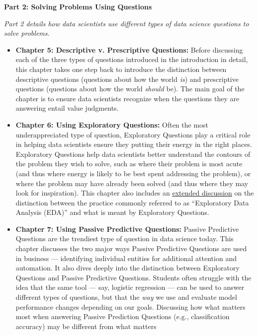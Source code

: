 \documentclass[12pt]{article}
\begin{document}
\textbf{Part 2: Solving Problems Using Questions}

\emph{Part 2 details how data scientists use different types of data
science questions to solve problems.}

\begin{itemize}

\item
  \textbf{Chapter 5: Descriptive v. Prescriptive Questions:} Before
  discussing each of the three types of questions introduced in the
  introduction in detail, this chapter takes one step back to introduce
  the distinction between descriptive questions (questions about how the
  world \emph{is}) and prescriptive questions (questions about how the
  world \emph{should} be). The main goal of the chapter is to ensure
  data scientists recognize when the questions they are answering entail
  value judgments.
\item
  \textbf{Chapter 6: Using Exploratory Questions:} Often the most
  underappreciated type of question, Exploratory Questions play a
  critical role in helping data scientists ensure they putting their
  energy in the right places. Exploratory Questions help data scientists
  better understand the contours of the problem they wish to solve, such
  as where their problem is most acute (and thus where energy is likely
  to be best spent addressing the problem), or where the problem may
  have already been solved (and thus where they may look for
  inspiration). This chapter also includes an
  \href{https://ds4humans.com/30_questions/07_eda.html}{extended
  discussion} on the distinction between the practice commonly referred
  to as ``Exploratory Data Analysis (EDA)'' and what is meant by
  Exploratory Questions.
\item
  \textbf{Chapter 7: Using Passive Predictive Questions:} Passive
  Predictive Questions are the trendiest type of question in data
  science today. This chapter discusses the two major ways Passive
  Predictive Questions are used in business --- identifying individual
  entities for additional attention and automation. It also dives deeply
  into the distinction between Exploratory Questions and Passive
  Predictive Questions. Students often struggle with the idea that the
  same tool --- say, logistic regression --- can be used to answer
  different types of questions, but that the \emph{way} we use and
  evaluate model performance changes depending on our goals. Discussing
  how what matters most when answering Passive Prediction Questions
  (e.g., classification accuracy) may be different from what matters

\end{itemize}
\end{document}

